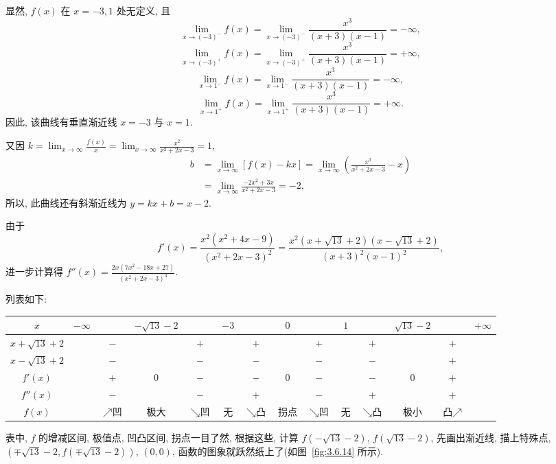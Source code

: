 \begin{solution}
显然, $f(x)$ 在 $x=-3,1$ 处无定义, 且
\[
\lim_{x\to(-3)^{-}}f(x)=\lim_{x\to(-3)^{-}}\frac{x^{3}}{(x+3)(x-1)}=-\infty,
\]
\[
\lim_{x\to(-3)^{+}}f(x)=\lim_{x\to(-3)^{+}}\frac{x^{3}}{(x+3)(x-1)}=+\infty,
\]
\[
\lim_{x\to 1^{-}}f(x)=\lim_{x\to 1^{-}}\frac{x^{3}}{(x+3)(x-1)}=-\infty,
\]
\[
\lim_{x\to 1^{+}}f(x)=\lim_{x\to 1^{+}}\frac{x^{3}}{(x+3)(x-1)}=+\infty.
\]
因此, 该曲线有垂直渐近线 $x=-3$ 与 $x=1$.

又因 $k=\lim_{x\to\infty}\frac{f(x)}{x}=\lim_{x\to\infty}\frac{x^{2}}{x^{2}+2x-3}=1$,
\begin{align*}
b&=\lim_{x\to\infty}[f(x)-kx]=\lim_{x\to\infty}\left(\frac{x^{3}}{x^{2}+2x-3}-x\right)\\
&=\lim_{x\to\infty}\frac{-2x^{2}+3x}{x^{2}+2x-3}=-2,
\end{align*}
所以, 此曲线还有斜渐近线为 $y=kx+b=x-2$.

由于
\[
f'(x)=\frac{x^{2}(x^{2}+4x-9)}{(x^{2}+2x-3)^{2}}=\frac{x^{2}(x+\sqrt{13}+2)(x-\sqrt{13}+2)}{(x+3)^{2}(x-1)^{2}},
\]
进一步计算得 $f''(x)=\frac{2x(7x^{2}-18x+27)}{(x^{2}+2x-3)^{3}}$.

列表如下:

\begin{center}
\footnotesize
\renewcommand{\arraystretch}{1.2}
\setlength{\tabcolsep}{2.2pt}
\begin{tabular}{c|c|c|c|c|c|c|c|c|c|c|c|c|c}
\hline
$x$ & $-\infty$ & & $-\sqrt{13}-2$ & & $-3$ & & $0$ & & $1$ & & $\sqrt{13}-2$ & & $+\infty$ \\
\hline
$x+\sqrt{13}+2$ & & $-$ & & $+$ & & $+$ & & $+$ & & $+$ & & $+$ & \\
\hline
$x-\sqrt{13}+2$ & & $-$ & & $-$ & & $-$ & & $-$ & & $-$ & & $+$ & \\
\hline
$f'(x)$ & & $+$ & $0$ & $-$ & & $-$ & $0$ & $-$ & & $-$ & $0$ & $+$ & \\
\hline
$f''(x)$ & & $-$ & & $-$ & & $+$ & & $-$ & & $+$ & & $+$ & \\
\hline
$f(x)$ & & $\nearrow\text{凹}$ & 极大 & $\searrow\text{凹}$ & 无 & $\searrow\text{凸}$ & 拐点 & $\searrow\text{凹}$ & 无 & $\searrow\text{凸}$ & 极小 & $\text{凸}\nearrow$ & \\
\hline
\end{tabular}
\end{center}

表中, $f$ 的增减区间, 极值点, 凹凸区间, 拐点一目了然, 根据这些, 计算 $f(-\sqrt{13}-2)$, $f(\sqrt{13}-2)$, 先画出渐近线, 描上特殊点, $(\mp\sqrt{13}-2,f(\mp\sqrt{13}-2))$, $(0,0)$, 函数的图象就跃然纸上了(如图~\ref{fig:3.6.14} 所示).
\end{solution}

